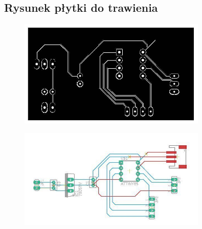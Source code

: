 \documentclass{article}
\begin{document}



\subsection{Rysunek płytki do trawienia}
\begin{figure}[ht!]
    \centering
    \includegraphics[width=0.8\textwidth]{plytka1.jpg}
    \label{fig:plytka1}
\end{figure}

\begin{figure}[ht!]
    \centering
    \includegraphics[width=0.8\textwidth]{plytka2.jpg}
    \label{fig:plytka2}
\end{figure}
\end{document}
